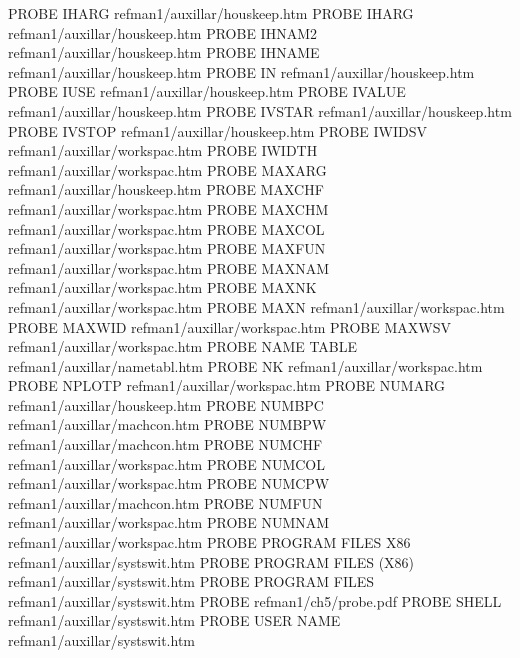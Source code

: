 PROBE IHARG                             refman1/auxillar/houskeep.htm
PROBE IHARG                             refman1/auxillar/houskeep.htm
PROBE IHNAM2                            refman1/auxillar/houskeep.htm
PROBE IHNAME                            refman1/auxillar/houskeep.htm
PROBE IN                                refman1/auxillar/houskeep.htm
PROBE IUSE                              refman1/auxillar/houskeep.htm
PROBE IVALUE                            refman1/auxillar/houskeep.htm
PROBE IVSTAR                            refman1/auxillar/houskeep.htm
PROBE IVSTOP                            refman1/auxillar/houskeep.htm
PROBE IWIDSV                            refman1/auxillar/workspac.htm
PROBE IWIDTH                            refman1/auxillar/workspac.htm
PROBE MAXARG                            refman1/auxillar/houskeep.htm
PROBE MAXCHF                            refman1/auxillar/workspac.htm
PROBE MAXCHM                            refman1/auxillar/workspac.htm
PROBE MAXCOL                            refman1/auxillar/workspac.htm
PROBE MAXFUN                            refman1/auxillar/workspac.htm
PROBE MAXNAM                            refman1/auxillar/workspac.htm
PROBE MAXNK                             refman1/auxillar/workspac.htm
PROBE MAXN                              refman1/auxillar/workspac.htm
PROBE MAXWID                            refman1/auxillar/workspac.htm
PROBE MAXWSV                            refman1/auxillar/workspac.htm
PROBE NAME TABLE                        refman1/auxillar/nametabl.htm
PROBE NK                                refman1/auxillar/workspac.htm
PROBE NPLOTP                            refman1/auxillar/workspac.htm
PROBE NUMARG                            refman1/auxillar/houskeep.htm
PROBE NUMBPC                            refman1/auxillar/machcon.htm
PROBE NUMBPW                            refman1/auxillar/machcon.htm
PROBE NUMCHF                            refman1/auxillar/workspac.htm
PROBE NUMCOL                            refman1/auxillar/workspac.htm
PROBE NUMCPW                            refman1/auxillar/machcon.htm
PROBE NUMFUN                            refman1/auxillar/workspac.htm
PROBE NUMNAM                            refman1/auxillar/workspac.htm
PROBE PROGRAM FILES X86                 refman1/auxillar/systswit.htm
PROBE PROGRAM FILES (X86)               refman1/auxillar/systswit.htm
PROBE PROGRAM FILES                     refman1/auxillar/systswit.htm
PROBE                                   refman1/ch5/probe.pdf
PROBE SHELL                             refman1/auxillar/systswit.htm
PROBE USER NAME                         refman1/auxillar/systswit.htm
